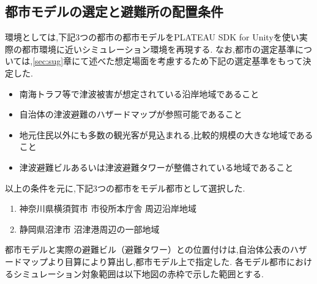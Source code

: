 \subsection{都市モデルの選定と避難所の配置条件}
環境としては,下記3つの都市の都市モデルをPLATEAU SDK for Unityを使い実際の都市環境に近いシミュレーション環境を再現する.
なお,都市の選定基準については,\ref{sec:sug}章にて述べた想定場面を考慮するため下記の選定基準をもって決定した.
\begin{itemize}
  \item 南海トラフ等で津波被害が想定されている沿岸地域であること
  \item 自治体の津波避難のハザードマップが参照可能であること
  \item 地元住民以外にも多数の観光客が見込まれる,比較的規模の大きな地域であること
  \item 津波避難ビルあるいは津波避難タワーが整備されている地域であること
\end{itemize}
以上の条件を元に,下記3つの都市をモデル都市として選択した.
\begin{enumerate}
  \item 神奈川県横須賀市 市役所本庁舎 周辺沿岸地域
  \item 静岡県沼津市 沼津港周辺の一部地域
\end{enumerate}
都市モデルと実際の避難ビル（避難タワー）との位置付けは,自治体公表のハザードマップより目算により算出し,都市モデル上で指定した.
各モデル都市におけるシミュレーション対象範囲は以下地図の赤枠で示した範囲とする.
